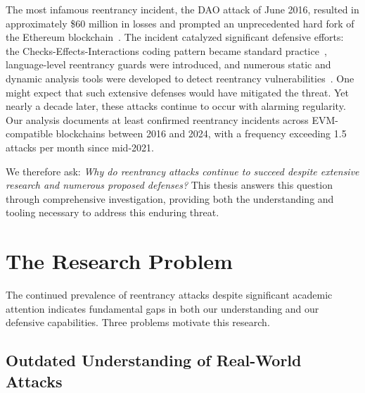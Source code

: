 The most infamous reentrancy incident, the DAO attack of June 2016, resulted in approximately \$60 million in losses and prompted an unprecedented hard fork of the Ethereum blockchain~\cite{the-dao-analysis}. The incident catalyzed significant defensive efforts: the Checks-Effects-Interactions coding pattern became standard practice~\cite{checks-effects-interactions}, language-level reentrancy guards were introduced, and numerous static and dynamic analysis tools were developed to detect reentrancy vulnerabilities~\cite{oyente, slither, sereum}. One might expect that such extensive defenses would have mitigated the threat.
Yet nearly a decade later, these attacks continue to occur with alarming regularity. Our analysis documents at least  confirmed reentrancy incidents across EVM-compatible blockchains between 2016 and 2024, with a frequency exceeding 1.5 attacks per month since mid-2021.

We therefore ask: \textit{Why do reentrancy attacks continue to succeed despite extensive research and numerous proposed defenses?} This thesis answers this question through comprehensive investigation, providing both the understanding and tooling necessary to address this enduring threat.

\section{The Research Problem}
\label{sec:intro-problem}

The continued prevalence of reentrancy attacks despite significant academic attention
indicates fundamental gaps in both our understanding and our defensive capabilities. Three problems motivate this research.

\subsection{Outdated Understanding of Real-World Attacks}

